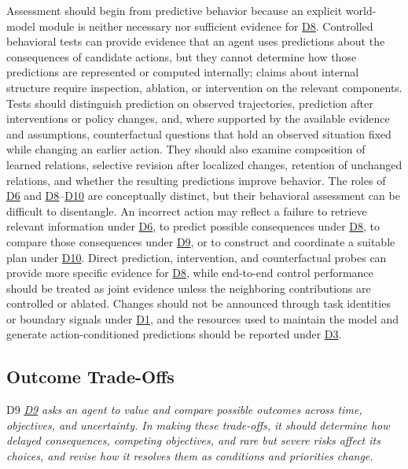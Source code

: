 \documentclass[10pt,journal,compsoc]{IEEEtran}
\DeclareRobustCommand{\Dref}[1]{\hyperref[sec:d#1]{D#1}}
\begin{document}
Assessment should begin from predictive behavior because an explicit world-model module is neither necessary nor sufficient evidence for \Dref{8}.
Controlled behavioral tests can provide evidence that an agent uses predictions about the consequences of candidate actions, but they cannot determine how those predictions are represented or computed internally; claims about internal structure require inspection, ablation, or intervention on the relevant components.
Tests should distinguish prediction on observed trajectories, prediction after interventions or policy changes, and, where supported by the available evidence and assumptions, counterfactual questions that hold an observed situation fixed while changing an earlier action.
They should also examine composition of learned relations, selective revision after localized changes, retention of unchanged relations, and whether the resulting predictions improve behavior.
The roles of \Dref{6} and \Dref{8}--\Dref{10} are conceptually distinct, but their behavioral assessment can be difficult to disentangle.
An incorrect action may reflect a failure to retrieve relevant information under \Dref{6}, to predict possible consequences under \Dref{8}, to compare those consequences under \Dref{9}, or to construct and coordinate a suitable plan under \Dref{10}.
Direct prediction, intervention, and counterfactual probes can provide more specific evidence for \Dref{8}, while end-to-end control performance should be treated as joint evidence unless the neighboring contributions are controlled or ablated.
Changes should not be announced through task identities or boundary signals under \Dref{1}, and the resources used to maintain the model and generate action-conditioned predictions should be reported under \Dref{3}.

\subsection{Outcome Trade-Offs}
\label{sec:d9}

\begin{briefbox}[behaviorbrief]{D9}
    \emph{\Dref{9} asks an agent to value and compare possible outcomes across time, objectives, and uncertainty.
    In making these trade-offs, it should determine how delayed consequences, competing objectives, and rare but severe risks affect its choices, and revise how it resolves them as conditions and priorities change.}
\end{briefbox}
\end{document}
